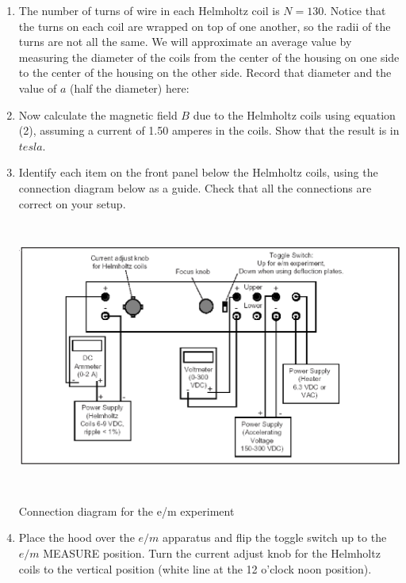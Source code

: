 \begin{enumerate}[labparts]

\item The number of turns of wire in each Helmholtz coil is $N=130$. Notice that 
the turns on each coil are wrapped on top of one another, so the radii of the 
turns are not all the same. We will approximate an average value by measuring 
the diameter of the coils from the center of the housing on one side to the 
center of the housing on the other side. Record that diameter and the value of 
$a$ (half the diameter) here:
\answerspace{0.4in}

\item Now calculate the magnetic field $B$ due to the Helmholtz coils using equation 
(2), assuming a current of 1.50 amperes in the coils. Show that the result is 
in $tesla$.
\answerspace{1.5in}

\pagebreak[3]

\item Identify each item on the front panel below
the Helmholtz coils, using the connection diagram below as a guide.
Check that all the connections are correct on your setup. 

\begin{center}
\includegraphics[trim=2mm 2mm 2mm 2mm, clip, height=3.5in]{eoverm/apparatus2.eps}

Connection diagram for the e/m experiment

\end{center}

\item Place the hood over the $e/m$ apparatus and flip the 
toggle switch up to the $e/m$ MEASURE
position.
Turn the current adjust knob for the Helmholtz coils to the vertical position (white line
at the 12 o'clock noon position).


\end{enumerate}
